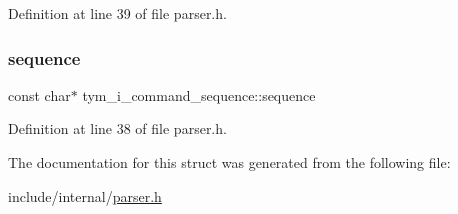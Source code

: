 Definition at line 39 of file parser.\+h.

\mbox{\label{structtym__i__command__sequence_a97eb218996497c02f77662293e3a617c}} 
\subsubsection{\texorpdfstring{sequence}{sequence}}
{\footnotesize\ttfamily const char$\ast$ tym\+\_\+i\+\_\+command\+\_\+sequence\+::sequence}



Definition at line 38 of file parser.\+h.



The documentation for this struct was generated from the following file\+:\begin{DoxyCompactItemize}
\item 
include/internal/\hyperlink{parser_8h}{parser.\+h}\end{DoxyCompactItemize}
